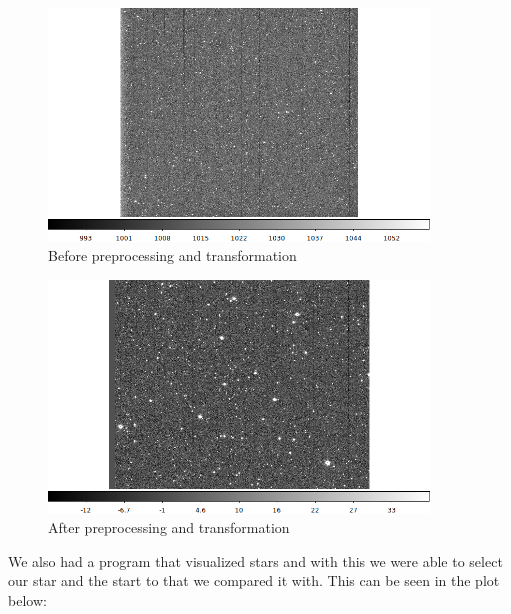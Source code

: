 \documentclass[a4paper,12pt]{article}
\begin{document}
\begin{minipage}{0.42\textwidth}
    \begin{figure}[H]
        \centering
        \includegraphics[width=0.9\textwidth]{../PSCH-20181012/psch/20181012/before200.png}
        \caption{Before preprocessing and transformation}
    \end{figure}
\end{minipage}
\begin{minipage}{0.42\textwidth}
    \begin{figure}[H]
        \centering
        \includegraphics[width=0.9\textwidth]{../PSCH-20181012/psch/20181012/after200.png}
        \caption{After preprocessing and transformation}
    \end{figure}
\end{minipage}

\vspace{0.5cm}

\par We also had a program that visualized stars and with this we were able to select our star
and the start to that we compared it with. This can be seen in the plot below:
\end{document}
